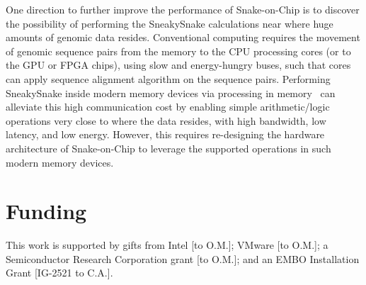 \documentclass{bioinfo}
\begin{document}
One direction to further improve the performance of Snake-on-Chip is to discover the possibility of performing the SneakySnake calculations {near where huge amounts} of genomic data resides. Conventional computing requires the movement of genomic sequence pairs from the memory to the CPU processing cores (or to the {GPU or FPGA chips}), using slow and energy-hungry buses, such that cores can apply sequence alignment algorithm on the sequence pairs. 
Performing SneakySnake inside modern memory devices {via processing in memory}~\citep{mutlu2019processing, ghose2019processing} can alleviate this high communication cost by enabling simple arithmetic/logic operations very close to where the data resides, with high bandwidth, low latency{, and low energy}. However, this requires re-designing the hardware architecture of Snake-on-Chip to leverage the supported operations in such modern memory devices. 


\vspace{-6 pt}
\section*{Funding}
This work is supported by gifts from Intel [to O.M.]; VMware [to O.M.]; {a Semiconductor Research Corporation grant [to O.M.];} and an EMBO Installation Grant [IG-2521 to C.A.].\\
\vspace{-20 pt}


% 
% 
% 
% 
% 




\end{document}
